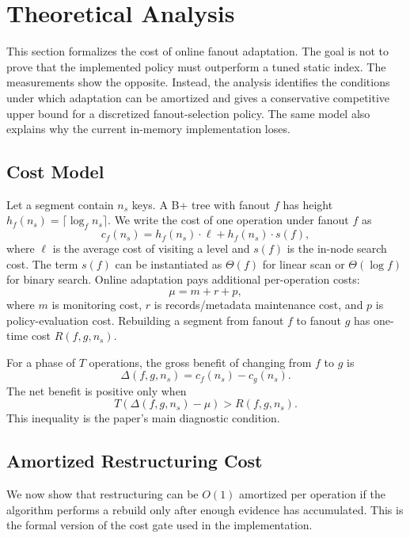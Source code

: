 
\section{Theoretical Analysis}
\label{sec:theoretical-analysis}

This section formalizes the cost of online fanout adaptation.  The goal is not
to prove that the implemented policy must outperform a tuned static index.  The
measurements show the opposite.  Instead, the analysis identifies the
conditions under which adaptation can be amortized and gives a conservative
competitive upper bound for a discretized fanout-selection policy.  The same
model also explains why the current in-memory implementation loses.

\subsection{Cost Model}

Let a segment contain $n_s$ keys.  A B+ tree with fanout $f$ has height
$h_f(n_s)=\lceil \log_f n_s\rceil$.  We write the cost of one operation under
fanout $f$ as
\[
  c_f(n_s) = h_f(n_s)\cdot \ell + h_f(n_s)\cdot s(f),
\]
where $\ell$ is the average cost of visiting a level and $s(f)$ is the
in-node search cost.  The term $s(f)$ can be instantiated as $\Theta(f)$ for
linear scan or $\Theta(\log f)$ for binary search.  Online adaptation pays
additional per-operation costs:
\[
  \mu = m + r + p,
\]
where $m$ is monitoring cost, $r$ is records/metadata maintenance cost, and
$p$ is policy-evaluation cost.  Rebuilding a segment from fanout $f$ to fanout
$g$ has one-time cost $R(f,g,n_s)$.

For a phase of $T$ operations, the gross benefit of changing from $f$ to $g$ is
\[
  \Delta(f,g,n_s)=c_f(n_s)-c_g(n_s).
\]
The net benefit is positive only when
\[
  T(\Delta(f,g,n_s)-\mu) > R(f,g,n_s).
\]
This inequality is the paper's main diagnostic condition.

\subsection{Amortized Restructuring Cost}

We now show that restructuring can be $O(1)$ amortized per operation if the
algorithm performs a rebuild only after enough evidence has accumulated.
This is the formal version of the cost gate used in the implementation.


